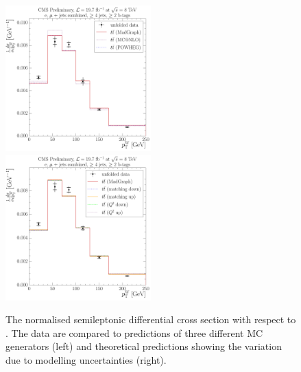 \begin{figure}[!htbp]
	\centering
  	{\includegraphics[width=0.5\textwidth]{measurement/WPT/central/normalised_xsection_combined_different_generators}}\hfill
  	{\includegraphics[width=0.5\textwidth]{measurement/WPT/central/normalised_xsection_combined_systematics_shifts}}
    \caption[The normalised semileptonic \ttbar differential cross section with respect to \WPT.]{The normalised
      semileptonic \ttbar differential cross section with respect to \WPT. The data are compared to predictions of three
      different MC generators (left) and theoretical predictions showing the variation due to modelling uncertainties
      (right).}
    \label{fig:results_WPT_combined}
\end{figure}

\newpage

